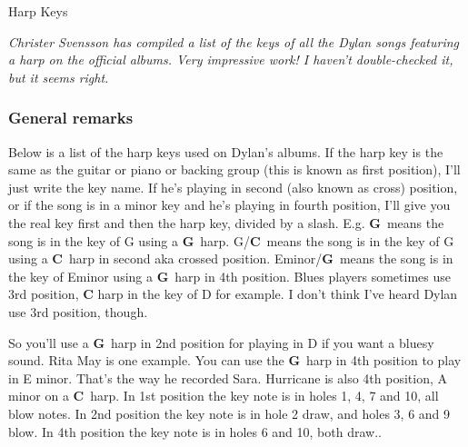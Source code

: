 
\thispagestyle{empty}
\label{harpkeys}

\vspace*{20ex}

\begin{flushright}{\Huge Harp Keys}\end{flushright}

\vspace{10ex}


\newcommand{\G}{\textcolor{G}{\textbf{G}}}
\newcommand{\A}{\textcolor{A}{\textbf{A}}}
\newcommand{\C}{\textcolor{C}{\textbf{C}}}
\newcommand{\D}{\textcolor{D}{\textbf{D}}}
\newcommand{\E}{\textcolor{E}{\textbf{E}}}

\noindent \textit{Christer Svensson has compiled a list of the keys of all
the Dylan songs featuring a harp on the official albums. Very impressive
work! I haven't double-checked it, but it seems right.}


\subsubsection*{General remarks}

Below is a list of the harp keys used on Dylan's albums. If the harp
key is the same as the guitar or piano or backing group (this is known
as first position), I'll just write the key name. If he's playing in
second (also known as cross) position, or if the song is in a minor
key and he's playing in fourth position, I'll give you the real
key first and then the harp key, divided by a slash. E.g. \G\ means
the song is in the key of G using a \G~harp. G/\C\ means the song is
in the key of G using a \C~harp in second aka crossed
position. Eminor/\G\ means the song is in the key of Eminor using a
\G~harp in 4th position. Blues players sometimes use 3rd position, \C
harp in the key of D for example. I don't think I've heard Dylan use
3rd position, though.

So you'll use a \G~harp in 2nd position for playing in D if you want a
bluesy sound. Rita May is one example. You can use the \G~harp in
4th position to play in E minor. That's the way he recorded
Sara. Hurricane is also 4th position, A minor on a \C~harp. In
1st position the key note is in holes 1, 4, 7 and 10, all blow
notes. In 2nd position the key note is in hole 2 draw, and holes 3, 6
and 9 blow. In 4th position the key note is in holes 6 and 10, both
draw..


